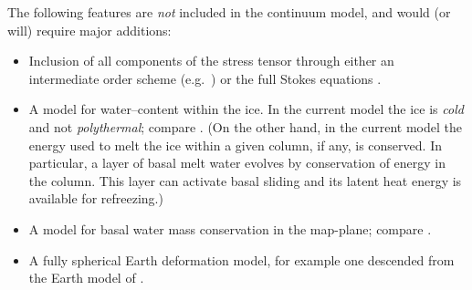 \documentclass[11pt,final]{amsart}
\begin{document}
The following features are \emph{not} included in the continuum model, and would (or will) require major additions:
\begin{itemize}
\item Inclusion of all components of the stress tensor through either an intermediate order scheme (e.g.~\cite{Blatter,Hindmarsh06,Pattyn03}) or the full Stokes equations \cite{Fowler}.
\item A model for water--content within the ice.  In the current model the ice is \emph{cold} and not \emph{polythermal}; compare \cite{Greve}.  (On the other hand, in the current model the energy used to melt the ice within a given column, if any, is conserved.  In particular, a layer of basal melt water evolves by conservation of energy in the column.  This layer can activate basal sliding and its latent heat energy is available for refreezing.)
\item A model for basal water mass conservation in the map-plane; compare \cite{JohnsonFastook}.
\item A fully spherical Earth deformation model, for example one descended from the Earth model of \cite{Peltier}.
\end{itemize}
\end{document}
